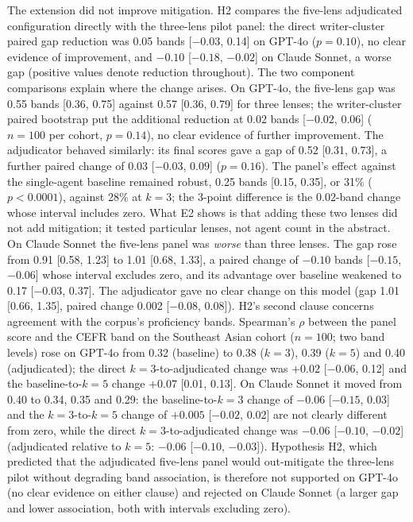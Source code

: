 The extension did not improve mitigation. H2 compares the
five-lens adjudicated configuration directly with the three-lens
pilot panel: the direct writer-cluster paired gap reduction was
0.05 bands [$-0.03$, 0.14] on GPT-4o ($p = 0.10$), no clear
evidence of improvement, and $-0.10$ [$-0.18$, $-0.02$] on Claude
Sonnet, a worse gap (positive values denote reduction throughout). The two component comparisons explain
where the change arises. On GPT-4o, the five-lens gap was 0.55
bands [0.36, 0.75] against 0.57 [0.36, 0.79] for three lenses; the writer-cluster paired bootstrap put the additional
reduction at 0.02 bands [$-0.02$, $0.06$] ($n = 100$ per cohort,
$p = 0.14$), no clear evidence of further improvement. The
adjudicator behaved similarly: its final scores gave a gap of 0.52
[0.31, 0.73], a further paired change of 0.03 [$-0.03$, $0.09$]
($p = 0.16$). The panel's effect against the single-agent baseline
remained robust, 0.25 bands [0.15, 0.35], or 31\% ($p < 0.0001$),
against 28\% at $k = 3$; the 3-point difference is the 0.02-band
change whose interval includes zero. What E2 shows is that adding
these two lenses did not add mitigation; it tested particular lenses,
not agent count in the abstract. On Claude Sonnet the
five-lens panel was \emph{worse} than three lenses. The gap rose
from 0.91 [0.58, 1.23] to 1.01 [0.68, 1.33], a paired change of
$-0.10$ bands [$-0.15$, $-0.06$] whose interval excludes zero, and
its advantage over baseline weakened to 0.17 [$-0.03$, 0.37]. The adjudicator gave no
clear change on this model (gap 1.01 [0.66, 1.35], paired change
0.002 [$-0.08$, $0.08$]). H2's second clause concerns agreement with
the corpus's proficiency bands. Spearman's $\rho$ between the panel
score and the CEFR band on the Southeast Asian cohort ($n = 100$;
two band levels) rose on GPT-4o from 0.32 (baseline) to 0.38
($k = 3$), 0.39 ($k = 5$) and 0.40 (adjudicated); the direct
$k{=}3$-to-adjudicated change was $+0.02$ [$-0.06$, 0.12] and the
baseline-to-$k{=}5$ change $+0.07$ [0.01, 0.13]. On Claude Sonnet
it moved from 0.40 to 0.34, 0.35 and 0.29: the baseline-to-$k{=}3$
change of $-0.06$ [$-0.15$, 0.03] and the $k{=}3$-to-$k{=}5$ change
of $+0.005$ [$-0.02$, 0.02] are not clearly different from zero,
while the direct $k{=}3$-to-adjudicated change was $-0.06$
[$-0.10$, $-0.02$] (adjudicated relative to $k{=}5$: $-0.06$
[$-0.10$, $-0.03$]). Hypothesis H2, which predicted that the
adjudicated five-lens panel would out-mitigate the three-lens pilot
without degrading band association, is therefore not supported on
GPT-4o (no clear evidence on either clause) and rejected on Claude
Sonnet (a larger gap and lower association, both with intervals
excluding zero).

